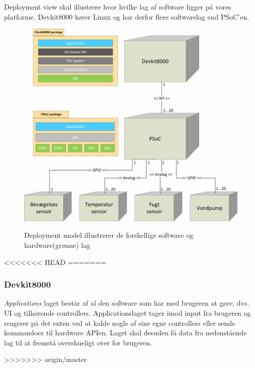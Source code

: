 
Deployment view skal illustrere hvor hvilke lag af software ligger på vores platforme. Devkit8000 kører Linux og har derfor flere softwarelag end PSoC'en.
 
\vspace{15 mm}

\begin{figure}[htbp] \centering
{\includegraphics[scale=0.7]{filer/systemarkitektur/Deployment_model}}
\caption{Deployment model illustrerer de forskellige software og hardware(grønne) lag}
\label{fig:Deployment Model}
\end{figure}

<<<<<<< HEAD
=======
\vspace{5 mm}

\subsubsection{Devkit8000}
\textit{Applications} laget består af al den software som har med brugeren at gøre, dvs. UI og tilhørende controllers. Applicationslaget tager imod input fra brugeren og reagerer på det enten ved at kalde nogle af sine egne controllers eller sende kommandoer til hardware APIen. Laget skal desuden få data fra nedenstående lag til at fremstå overskueligt over for brugeren.

>>>>>>> origin/master
\clearpage


